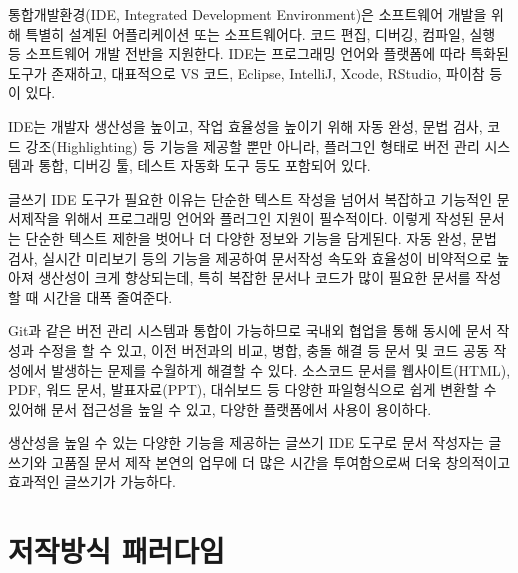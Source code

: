 \documentclass[
  letterpaper,
]{book}
\begin{document}
\begin{tcolorbox}[enhanced jigsaw, opacityback=0, opacitybacktitle=0.6, colback=white, rightrule=.15mm, coltitle=black, colframe=quarto-callout-note-color-frame, colbacktitle=quarto-callout-note-color!10!white, bottomrule=.15mm, bottomtitle=1mm, breakable, title=\textcolor{quarto-callout-note-color}{\faInfo}\hspace{0.5em}{통합개발환경}, titlerule=0mm, leftrule=.75mm, toptitle=1mm, left=2mm, arc=.35mm, toprule=.15mm]

통합개발환경(IDE, Integrated Development Environment)은 소프트웨어
개발을 위해 특별히 설계된 어플리케이션 또는 소프트웨어다. 코드 편집,
디버깅, 컴파일, 실행 등 소프트웨어 개발 전반을 지원한다. IDE는
프로그래밍 언어와 플랫폼에 따라 특화된 도구가 존재하고, 대표적으로 VS
코드, Eclipse, IntelliJ, Xcode, RStudio, 파이참 등이 있다.

IDE는 개발자 생산성을 높이고, 작업 효율성을 높이기 위해 자동 완성, 문법
검사, 코드 강조(Highlighting) 등 기능을 제공할 뿐만 아니라, 플러그인
형태로 버전 관리 시스템과 통합, 디버깅 툴, 테스트 자동화 도구 등도
포함되어 있다.

\end{tcolorbox}

글쓰기 IDE 도구가 필요한 이유는 단순한 텍스트 작성을 넘어서 복잡하고
기능적인 문서제작을 위해서 프로그래밍 언어와 플러그인 지원이 필수적이다.
이렇게 작성된 문서는 단순한 텍스트 제한을 벗어나 더 다양한 정보와 기능을
담게된다. 자동 완성, 문법 검사, 실시간 미리보기 등의 기능을 제공하여
문서작성 속도와 효율성이 비약적으로 높아져 생산성이 크게 향상되는데,
특히 복잡한 문서나 코드가 많이 필요한 문서를 작성할 때 시간을 대폭
줄여준다.

Git과 같은 버전 관리 시스템과 통합이 가능하므로 국내외 협업을 통해
동시에 문서 작성과 수정을 할 수 있고, 이전 버전과의 비교, 병합, 충돌
해결 등 문서 및 코드 공동 작성에서 발생하는 문제를 수월하게 해결할 수
있다. 소스코드 문서를 웹사이트(HTML), PDF, 워드 문서, 발표자료(PPT),
대쉬보드 등 다양한 파일형식으로 쉽게 변환할 수 있어해 문서 접근성을 높일
수 있고, 다양한 플랫폼에서 사용이 용이하다.

생산성을 높일 수 있는 다양한 기능을 제공하는 글쓰기 IDE 도구로 문서
작성자는 글쓰기와 고품질 문서 제작 본연의 업무에 더 많은 시간을
투여함으로써 더욱 창의적이고 효과적인 글쓰기가 가능하다.

\hypertarget{paradigm}{%
\section{저작방식 패러다임}\label{paradigm}}
\end{document}
